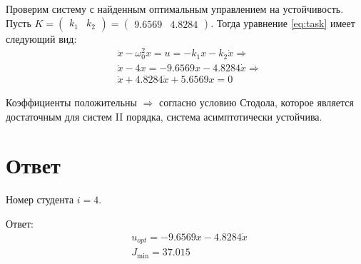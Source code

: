 \documentclass[a4paper,12pt]{article}
\begin{document}
Проверим систему с найденным оптимальным управлением на устойчивость.
Пусть $ K = \begin{pmatrix}
    k_1 & k_2
\end{pmatrix} = \begin{pmatrix}
9.6569 &  4.8284
\end{pmatrix} $.
Тогда уравнение \eqref{eq:task} имеет следующий вид:
\begin{align*}
    & \ddot x - \omega_0^2 x = u = - k_1 x - k_2 \dot x \Rightarrow \\
    & \ddot x - 4 x = -9.6569x - 4.8284 \dot x \Rightarrow \\
    & \boxed{ \ddot x + 4.8284 \dot x + 5.6569 x = 0 }
\end{align*}

Коэффициенты положительны $ \Rightarrow $ согласно условию Стодола, которое является достаточным для систем II порядка, система асимптотически устойчива.

\section{ Ответ }

Номер студента $ i = 4 $.

Ответ:
\begin{align*}
    & u_{opt} = - 9.6569 x - 4.8284 \dot x \\
    & J_{\min} = 37.015 \\
\end{align*}
\end{document}
